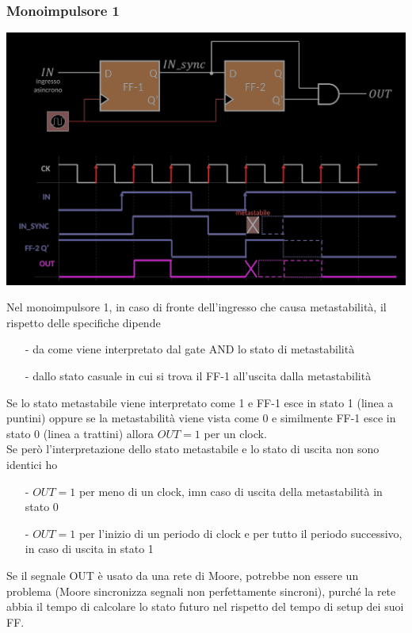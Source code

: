 \documentclass{article}
\begin{document}
\subsubsection*{Monoimpulsore 1}
\begin{center}
    \includegraphics[scale=0.35]{monoimpulsore 1.png}
\end{center}
Nel monoimpulsore 1, in caso di fronte dell’ingresso che causa metastabilità, il rispetto delle specifiche dipende
\begin{itemize}
    \item [-]da come viene interpretato dal gate AND lo stato di metastabilità
    \item [-]dallo stato casuale in cui si trova il FF-1 all’uscita dalla metastabilità
\end{itemize}
Se lo stato metastabile viene interpretato come 1 e FF-1 esce in stato 1 (linea a puntini) oppure se la metastabilità viene vista come 0 e similmente FF-1 esce in stato 0 (linea a trattini) allora $OUT=1$ per un clock.\\
Se però l’interpretazione dello stato metastabile e lo stato di uscita non sono identici ho
\begin{itemize}
    \item[-] $OUT=1$ per meno di un clock, imn caso di uscita della metastabilità in stato 0
    \item[-] $OUT=1$ per l’inizio di un periodo di clock e per tutto il periodo successivo, in caso di uscita in stato 1
\end{itemize}
Se il segnale OUT è usato da una rete di Moore, potrebbe non essere un problema (Moore sincronizza segnali non perfettamente sincroni), purché la rete abbia il tempo di calcolare lo stato futuro nel rispetto del tempo di setup dei suoi FF.
\end{document}
